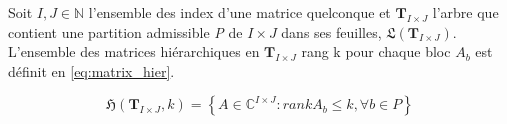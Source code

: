 \documentclass[a4paper, 15pt]{report}
\begin{document}
    Soit $I,J \in \mathbb{N}$ l'ensemble des index d'une matrice quelconque et $\mathbf{T}_{I \times J}$ l'arbre que contient une partition admissible \textit{P} de $ I \times J$ dans ses feuilles, $\mathfrak{L}(\mathbf{T}_{I \times J})$. L'ensemble des matrices hiérarchiques en $\mathbf{T}_{I \times J}$ rang k pour chaque bloc $A_{b}$ est définit en \ref{eq:matrix_hier}.

    \begin{equation}\label{eq:matrix_hier}
        \mathfrak{H}(\mathbf{T}_{I \times J},k) = \left\{  A\in \mathbb{C}^{I\times J} : rankA_{b} \leq k, \forall b \in P \right\}
    \end{equation}
    



    
    
    
\end{document}
